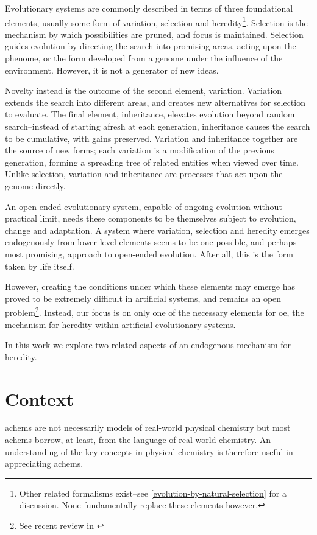 Evolutionary systems are commonly described in terms of three foundational elements, usually some form of variation, selection and heredity\footnote{Other related formalisms exist--see \cref{evolution-by-natural-selection} for a discussion. None fundamentally replace these elements however.}. Selection is the mechanism by which possibilities are pruned, and focus is maintained. Selection guides evolution by directing the search into promising areas, acting upon the phenome, or the form developed from a genome under the influence of the environment. However, it is not a generator of new ideas. 

Novelty instead is the outcome of the second element, variation. Variation extends the search into different areas, and creates new alternatives for selection to evaluate. The final element, inheritance, elevates evolution beyond random search--instead of starting afresh at each generation, inheritance causes the search to be cumulative, with gains preserved. Variation and inheritance together are the source of new forms; each variation is a modification of the previous generation, forming a spreading tree of related entities when viewed over time. Unlike selection, variation and inheritance are processes that act upon the genome directly.

An open-ended evolutionary system, capable of ongoing evolution without practical limit, needs these components to be themselves subject to evolution, change and adaptation. A system where variation, selection and heredity emerges endogenously from lower-level elements seems to be one possible, and perhaps most promising, approach to open-ended evolution. After all, this is the form taken by life itself. 

However, creating the conditions under which these elements may emerge has proved to be extremely difficult in artificial systems, and remains an open problem\footnote{See recent review in \cite{BanzhafBaumgaertnerBeslonEtAl2016}}. Instead, our focus is on only one of the necessary elements for \gls{oe}, the mechanism for heredity within artificial evolutionary systems.

In this work we explore two related aspects of an endogenous mechanism for heredity.

\section{Context}\label{context}

\Glspl{achem} are not necessarily models of real-world physical chemistry but most \glspl{achem} borrow, at least, from the language of real-world chemistry. An understanding of the key concepts in physical chemistry is therefore useful in appreciating \glspl{achem}.

